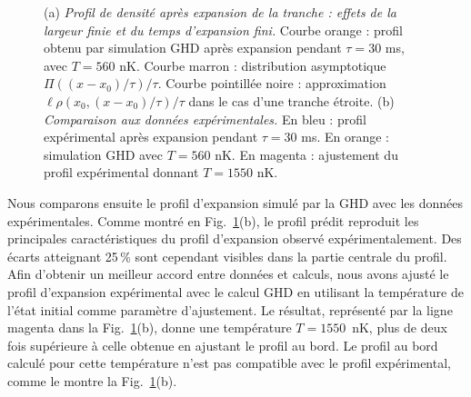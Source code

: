 


\begin{figure}[!htb]
\centering
{}
\caption{(a) {\it Profil de densité après expansion de la tranche : effets de la largeur finie et du temps d’expansion fini.} Courbe orange : profil obtenu par simulation GHD après expansion pendant $\tau = 30$ ms, avec $T = 560$ nK. Courbe marron : distribution asymptotique $\Pi((x - x_0)/\tau)/\tau$. Courbe pointillée noire : approximation $\ell \rho(x_0, (x - x_0)/\tau)/\tau$ dans le cas d’une tranche étroite. (b) {\it Comparaison aux données expérimentales.} En bleu : profil expérimental après expansion pendant $\tau = 30$ ms. En orange : simulation GHD avec $T = 560$ nK. En magenta : ajustement du profil expérimental donnant $T = 1550$ nK.}
\label{fig:simul_expansion}
\end{figure}

Nous comparons ensuite le profil d'expansion simulé par la GHD avec les données expérimentales. Comme montré en Fig.~\ref{fig:simul_expansion}(b), le profil prédit reproduit les principales caractéristiques du profil d'expansion observé expérimentalement. Des écarts atteignant 25\,\% sont cependant visibles dans la partie centrale du profil. Afin d'obtenir un meilleur accord entre données et calculs, nous avons ajusté le profil d'expansion expérimental avec le calcul GHD en utilisant la température de l'état initial comme paramètre d'ajustement. Le résultat, représenté par la ligne magenta dans la Fig.~\ref{fig:simul_expansion}(b), donne une température $T=1550$~nK, plus de deux fois supérieure à celle obtenue en ajustant le profil au bord. Le profil au bord calculé pour cette température n'est pas compatible avec le profil expérimental, comme le montre la Fig.~\ref{fig:simul_expansion}(b).

